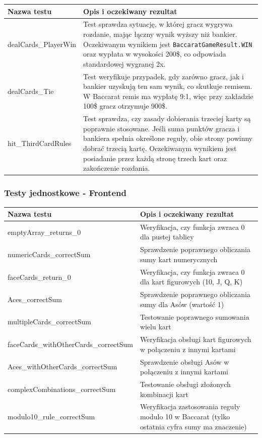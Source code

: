 \documentclass[a4paper,12pt]{article}
\begin{document}
\begin{tabularx}{\textwidth}{lX}
\toprule
\textbf{Nazwa testu} & \textbf{Opis i oczekiwany rezultat} \\
\midrule
dealCards\_PlayerWin & Test sprawdza sytuację, w której gracz wygrywa rozdanie, mając łączny wynik wyższy niż bankier. Oczekiwanym wynikiem jest \texttt{BaccaratGameResult.WIN} oraz wypłata w wysokości 200\$, co odpowiada standardowej wygranej 2x. \\
dealCards\_Tie & Test weryfikuje przypadek, gdy zarówno gracz, jak i bankier uzyskują ten sam wynik, co skutkuje remisem. W Baccarat remis ma wypłatę 9:1, więc przy zakładzie 100\$ gracz otrzymuje 900\$. \\
hit\_ThirdCardRules & Test sprawdza, czy zasady dobierania trzeciej karty są poprawnie stosowane. Jeśli suma punktów gracza i bankiera spełnia określone reguły, obie strony powinny dobrać trzecią kartę. Oczekiwanym wynikiem jest posiadanie przez każdą stronę trzech kart oraz zakończenie rozdania. \\
\bottomrule
\end{tabularx}

\subsubsection*{Testy jednostkowe - Frontend}

\begin{tabularx}{\textwidth}{lX}
\toprule
\textbf{Nazwa testu} & \textbf{Opis i oczekiwany rezultat} \\
\midrule
emptyArray\_returns\_0 & Weryfikacja, czy funkcja zwraca 0 dla pustej tablicy \\
numericCards\_correctSum & Sprawdzenie poprawnego obliczania sumy kart numerycznych \\
faceCards\_return\_0 & Weryfikacja, czy funkcja zwraca 0 dla kart figurowych (10, J, Q, K) \\
Aces\_correctSum & Sprawdzenie poprawnego obliczania sumy dla Asów (wartość 1) \\
multipleCards\_correctSum & Testowanie poprawnego sumowania wielu kart \\
faceCards\_withOtherCards\_correctSum & Weryfikacja obsługi kart figurowych w połączeniu z innymi kartami \\
Aces\_withOtherCards\_correctSum & Sprawdzenie obsługi Asów w połączeniu z innymi kartami \\
complexCombinations\_correctSum & Testowanie obsługi złożonych kombinacji kart \\
modulo10\_rule\_correctSum & Weryfikacja zastosowania reguły modulo 10 w Baccarat (tylko ostatnia cyfra sumy ma znaczenie) \\
\bottomrule
\end{tabularx}
\end{document}

